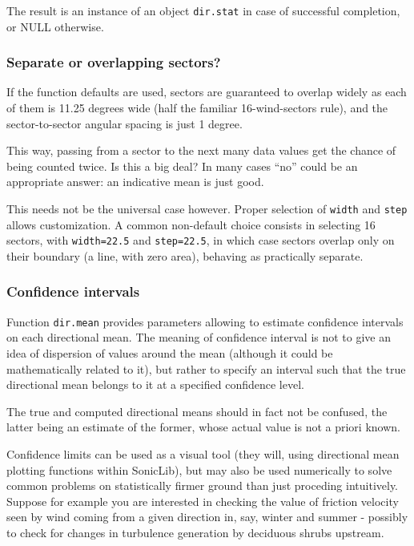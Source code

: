 \documentclass[a4paper,10pt]{book}
\begin{document}
The result is an instance of an object \verb|dir.stat| in case of successful completion, or NULL otherwise.

\subsubsection{Separate or overlapping sectors?}

If the function defaults are used, sectors are guaranteed to overlap widely as each of them is 11.25 degrees wide (half  the familiar 16-wind-sectors rule), and the sector-to-sector angular spacing is just 1 degree.

This way, passing from a sector to the next many data values get the chance of being counted twice. Is this a big deal? In many cases ``no'' could be an appropriate answer: an indicative mean is just good.

This needs not be the universal case however. Proper selection of \verb|width| and \verb|step| allows customization. A common non-default choice consists in selecting 16 sectors, with \verb|width=22.5| and \verb|step=22.5|, in which case sectors overlap only on their boundary (a line, with zero area), behaving as practically separate.

\subsubsection{Confidence intervals}

Function \verb|dir.mean| provides parameters allowing to estimate confidence intervals on each directional mean. The meaning of confidence interval is not to give an idea of dispersion of values around the mean (although it could be mathematically related to it), but rather to specify an interval such that the true directional mean belongs to it at a specified confidence level.

The true and computed directional means should in fact not be confused, the latter being an estimate of the former, whose actual value is not a priori known.

Confidence limits can be used as a visual tool (they will, using directional mean plotting functions within SonicLib), but may also be used numerically to solve common problems on statistically firmer ground than just proceding intuitively. Suppose for example you are interested in checking the value of friction velocity seen by wind coming from a given direction in, say, winter and summer - possibly to check for changes in turbulence generation by deciduous shrubs upstream.
\end{document}
